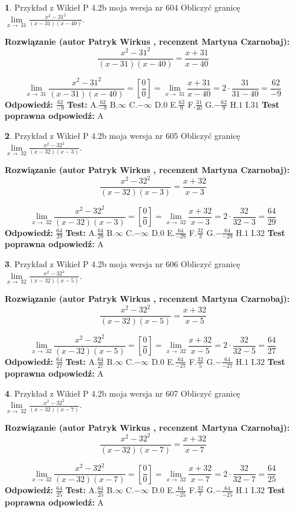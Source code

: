 \documentclass[12pt, a4paper]{article}
\theoremstyle{definition} %
\newtheorem{zad}{}
\newcommand{\zadStart}[1]{\begin{zad}#1\newline}
\newcommand{\zadStop}{\end{zad}}
\newcommand{\rozwStart}[2]{\noindent \textbf{Rozwiązanie (autor #1 , recenzent #2): }\newline}
\newcommand{\rozwStop}{\newline}
\newcommand{\odpStart}{\noindent \textbf{Odpowiedź:}\newline}
\newcommand{\odpStop}{\newline}
\newcommand{\testStart}{\noindent \textbf{Test:}\newline}
\newcommand{\testStop}{\newline}
\newcommand{\kluczStart}{\noindent \textbf{Test poprawna odpowiedź:}\newline}
\newcommand{\kluczStop}{\newline}
\begin{document}
\zadStart{Przykład z Wikieł P 4.2b moja wersja nr 604}
Obliczyć granicę $\lim\limits_{x\to\ 31}\frac{x^{2}-31^{2}}{(x-31)(x-40)}$.
\zadStop
\rozwStart{Patryk Wirkus}{Martyna Czarnobaj}
$$\frac{x^{2}-31^{2}}{(x-31)(x-40)}=\frac{x+31}{x-40}$$

$$\lim\limits_{x\to\ 31}\frac{x^{2}-31^{2}}{(x-31)(x-40)}=[\frac{0}{0}]=\lim\limits_{x\to\ 31}\frac{x+31}{x-40}=2 \cdot \frac{31}{31-40} = \frac{62}{-9}$$
\rozwStop
\odpStart
$\frac{62}{-9}$
\odpStop
\testStart
A.$\frac{62}{-9}$
B.$\infty$
C.$-\infty$
D.$0$
E.$\frac{62}{9}$
F.$\frac{31}{40}$
G.$-\frac{62}{9}$
H.$1$
I.$31$
\testStop
\kluczStart
A
\kluczStop



\zadStart{Przykład z Wikieł P 4.2b moja wersja nr 605}
Obliczyć granicę $\lim\limits_{x\to\ 32}\frac{x^{2}-32^{2}}{(x-32)(x-3)}$.
\zadStop
\rozwStart{Patryk Wirkus}{Martyna Czarnobaj}
$$\frac{x^{2}-32^{2}}{(x-32)(x-3)}=\frac{x+32}{x-3}$$

$$\lim\limits_{x\to\ 32}\frac{x^{2}-32^{2}}{(x-32)(x-3)}=[\frac{0}{0}]=\lim\limits_{x\to\ 32}\frac{x+32}{x-3}=2 \cdot \frac{32}{32-3} = \frac{64}{29}$$
\rozwStop
\odpStart
$\frac{64}{29}$
\odpStop
\testStart
A.$\frac{64}{29}$
B.$\infty$
C.$-\infty$
D.$0$
E.$\frac{64}{-29}$
F.$\frac{32}{3}$
G.$-\frac{64}{-29}$
H.$1$
I.$32$
\testStop
\kluczStart
A
\kluczStop



\zadStart{Przykład z Wikieł P 4.2b moja wersja nr 606}
Obliczyć granicę $\lim\limits_{x\to\ 32}\frac{x^{2}-32^{2}}{(x-32)(x-5)}$.
\zadStop
\rozwStart{Patryk Wirkus}{Martyna Czarnobaj}
$$\frac{x^{2}-32^{2}}{(x-32)(x-5)}=\frac{x+32}{x-5}$$

$$\lim\limits_{x\to\ 32}\frac{x^{2}-32^{2}}{(x-32)(x-5)}=[\frac{0}{0}]=\lim\limits_{x\to\ 32}\frac{x+32}{x-5}=2 \cdot \frac{32}{32-5} = \frac{64}{27}$$
\rozwStop
\odpStart
$\frac{64}{27}$
\odpStop
\testStart
A.$\frac{64}{27}$
B.$\infty$
C.$-\infty$
D.$0$
E.$\frac{64}{-27}$
F.$\frac{32}{5}$
G.$-\frac{64}{-27}$
H.$1$
I.$32$
\testStop
\kluczStart
A
\kluczStop



\zadStart{Przykład z Wikieł P 4.2b moja wersja nr 607}
Obliczyć granicę $\lim\limits_{x\to\ 32}\frac{x^{2}-32^{2}}{(x-32)(x-7)}$.
\zadStop
\rozwStart{Patryk Wirkus}{Martyna Czarnobaj}
$$\frac{x^{2}-32^{2}}{(x-32)(x-7)}=\frac{x+32}{x-7}$$

$$\lim\limits_{x\to\ 32}\frac{x^{2}-32^{2}}{(x-32)(x-7)}=[\frac{0}{0}]=\lim\limits_{x\to\ 32}\frac{x+32}{x-7}=2 \cdot \frac{32}{32-7} = \frac{64}{25}$$
\rozwStop
\odpStart
$\frac{64}{25}$
\odpStop
\testStart
A.$\frac{64}{25}$
B.$\infty$
C.$-\infty$
D.$0$
E.$\frac{64}{-25}$
F.$\frac{32}{7}$
G.$-\frac{64}{-25}$
H.$1$
I.$32$
\testStop
\kluczStart
A
\kluczStop
\end{document}
